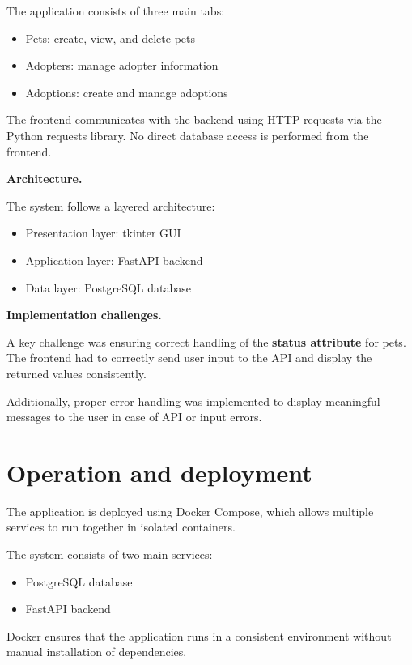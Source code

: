 \documentclass[11pt,a4paper]{article}
\begin{document}
The application consists of three main tabs:

\begin{itemize}
\item Pets: create, view, and delete pets
\item Adopters: manage adopter information
\item Adoptions: create and manage adoptions
\end{itemize}

The frontend communicates with the backend using HTTP requests via the Python
requests library. No direct database access is performed from the frontend.

\textbf{Architecture.}

The system follows a layered architecture:
\begin{itemize}
\item Presentation layer: tkinter GUI
\item Application layer: FastAPI backend
\item Data layer: PostgreSQL database
\end{itemize}

\textbf{Implementation challenges.}

A key challenge was ensuring correct handling of the \textbf{status attribute}
for pets. The frontend had to correctly send user input to the API and display
the returned values consistently.

Additionally, proper error handling was implemented to display meaningful
messages to the user in case of API or input errors.
\section{Operation and deployment}


The application is deployed using Docker Compose, which allows multiple services
to run together in isolated containers.

The system consists of two main services:
\begin{itemize}
\item PostgreSQL database
\item FastAPI backend
\end{itemize}

Docker ensures that the application runs in a consistent environment without
manual installation of dependencies.
\end{document}
